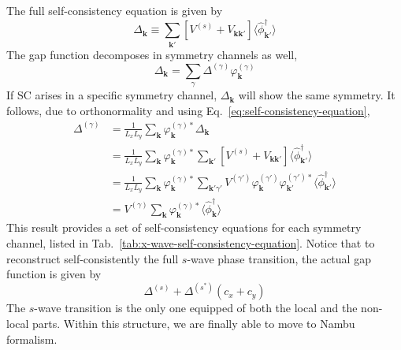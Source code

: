The full self-consistency equation is given by
\begin{equation}\label{eq:self-consistency-equation}
	\Delta_\mathbf{k} \equiv \sum_{\mathbf{k}'}
	\left[
		V^{(s)} +
		V_{\mathbf{k}\mathbf{k}'}
	\right]
	\langle
		\hat \phi_{\mathbf{k}'}^\dagger
	\rangle
\end{equation}
The gap function decomposes in symmetry channels as well,
\[
\Delta_\mathbf{k} = \sum_\gamma \Delta^{(\gamma)} \varphi_\mathbf{k}^{(\gamma)}
\]
If SC arises in a specific symmetry channel, $\Delta_\mathbf{k}$ will show the same symmetry. It follows, due to orthonormality and using Eq.~\eqref{eq:self-consistency-equation},
\begin{align}
	\Delta^{(\gamma)} &= \frac{1}{L_xL_y} \sum_{\mathbf{k}} \varphi_\mathbf{k}^{(\gamma)*} \Delta_\mathbf{k} \nonumber \\
	&= \frac{1}{L_xL_y} \sum_{\mathbf{k}} \varphi_\mathbf{k}^{(\gamma)*} \sum_{\mathbf{k}'}
	\left[
		V^{(s)} +
	V_{\mathbf{k}\mathbf{k}'}
	\right]
	\langle
		\hat \phi_{\mathbf{k}'}^\dagger
	\rangle \nonumber \\
	&= \frac{1}{L_xL_y} \sum_{\mathbf{k}} \varphi_\mathbf{k}^{(\gamma)*} \sum_{\mathbf{k}'\gamma'}
	V^{(\gamma')} \varphi_\mathbf{k}^{(\gamma')} \varphi_{\mathbf{k}'}^{(\gamma')*}
	\langle
		\hat \phi_{\mathbf{k}'}^\dagger
	\rangle \nonumber \\
	&= V^{(\gamma)} \sum_{\mathbf{k}} \varphi_\mathbf{k}^{(\gamma)*} \langle
		\hat \phi_{\mathbf{k}}^\dagger
	\rangle \label{eq:self-consistency-equation-explicit}
\end{align}
This result provides a set of self-consistency equations for each symmetry channel, listed in Tab.~\ref{tab:x-wave-self-consistency-equation}. Notice that to reconstruct self-consistently the full $s$-wave phase transition, the actual gap function is given by
\[
	\Delta^{(s)} + \Delta^{(s^*)} (c_x + c_y)
\]
The $s$-wave transition is the only one equipped of both the local and the non-local parts. Within this structure, we are finally able to move to Nambu formalism.

